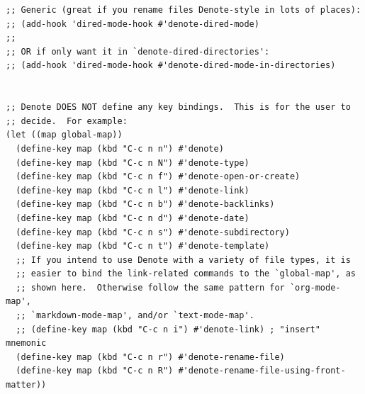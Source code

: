 \documentclass[11pt]{article}
\begin{document}
\begin{verbatim}
;; Generic (great if you rename files Denote-style in lots of places):
;; (add-hook 'dired-mode-hook #'denote-dired-mode)
;;
;; OR if only want it in `denote-dired-directories':
;; (add-hook 'dired-mode-hook #'denote-dired-mode-in-directories)


;; Denote DOES NOT define any key bindings.  This is for the user to
;; decide.  For example:
(let ((map global-map))
  (define-key map (kbd "C-c n n") #'denote)
  (define-key map (kbd "C-c n N") #'denote-type)
  (define-key map (kbd "C-c n f") #'denote-open-or-create)
  (define-key map (kbd "C-c n l") #'denote-link)
  (define-key map (kbd "C-c n b") #'denote-backlinks)
  (define-key map (kbd "C-c n d") #'denote-date)
  (define-key map (kbd "C-c n s") #'denote-subdirectory)
  (define-key map (kbd "C-c n t") #'denote-template)
  ;; If you intend to use Denote with a variety of file types, it is
  ;; easier to bind the link-related commands to the `global-map', as
  ;; shown here.  Otherwise follow the same pattern for `org-mode-map',
  ;; `markdown-mode-map', and/or `text-mode-map'.
  ;; (define-key map (kbd "C-c n i") #'denote-link) ; "insert" mnemonic
  (define-key map (kbd "C-c n r") #'denote-rename-file)
  (define-key map (kbd "C-c n R") #'denote-rename-file-using-front-matter))
\end{verbatim}
\end{document}

